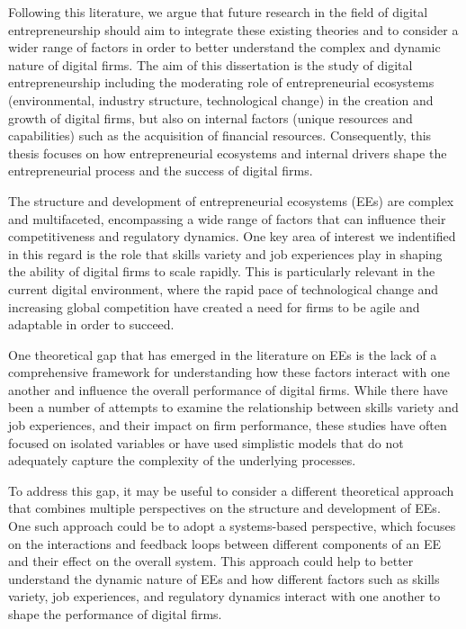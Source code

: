 \documentclass[12pt]{article}
\begin{document}
Following this literature, we argue that future research in the field of digital entrepreneurship should aim to integrate these existing theories and to consider a wider range of factors in order to better understand the complex and dynamic nature of digital firms. The aim of this dissertation is the study of digital entrepreneurship including the moderating role of entrepreneurial ecosystems (environmental, industry structure, technological change) in the creation and growth of digital firms, but also on internal factors (unique resources and capabilities) such as the acquisition of financial resources. Consequently, this thesis focuses on how entrepreneurial ecosystems and internal drivers shape the entrepreneurial process and the success of digital firms.

The structure and development of entrepreneurial ecosystems (EEs) are complex and multifaceted, encompassing a wide range of factors that can influence their competitiveness and regulatory dynamics. One key area of interest we indentified in this regard is the role that skills variety and job experiences play in shaping the ability of digital firms to scale rapidly. This is particularly relevant in the current digital environment, where the rapid pace of technological change and increasing global competition have created a need for firms to be agile and adaptable in order to succeed.

One theoretical gap that has emerged in the literature on EEs is the lack of a comprehensive framework for understanding how these factors interact with one another and influence the overall performance of digital firms. While there have been a number of attempts to examine the relationship between skills variety and job experiences, and their impact on firm performance, these studies have often focused on isolated variables or have used simplistic models that do not adequately capture the complexity of the underlying processes.

To address this gap, it may be useful to consider a different theoretical approach that combines multiple perspectives on the structure and development of EEs. One such approach could be to adopt a systems-based perspective, which focuses on the interactions and feedback loops between different components of an EE and their effect on the overall system. This approach could help to better understand the dynamic nature of EEs and how different factors such as skills variety, job experiences, and regulatory dynamics interact with one another to shape the performance of digital firms.
\end{document}
